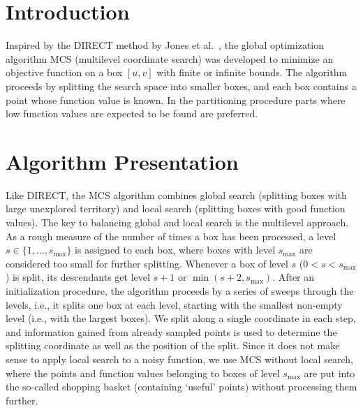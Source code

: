 \documentclass{sig-alternate}
\begin{document}



\section{Introduction}
%
Inspired by the {DIRECT} method by Jones et al.~\cite{jones}, the global
optimization algorithm MCS (multilevel coordinate search) \cite{mcs} was developed 
to minimize an objective function on a box $[u,v]$ with finite or infinite bounds.
The algorithm proceeds by splitting the search space into smaller boxes, and each
box contains a point whose function value is known. In the partitioning procedure
parts where low function values are expected to be found are preferred.

\section{Algorithm Presentation}
%
Like {DIRECT}, the MCS algorithm combines global search (splitting boxes with
large unexplored territory) and local search (splitting boxes with good function
values). The key to balancing global and local search is the multilevel approach.
As a rough measure of the number of times a box has been processed, a level
$s \in \{1,\dots,s_{\max}\}$ is assigned to each box, where boxes with level $s_{\max}$ 
are considered too small for further splitting. Whenever a box of level $s$
($0 < s < s_{\max}$) is split, its descendants get level $s+1$ or $\min(s+2,s_{\max})$.
After an initialization procedure, the algorithm proceeds by a series of sweeps
through the levels, i.e., it splits one box at each level, starting with the 
smallest non-empty level (i.e., with the largest boxes). We split along a single
coordinate in each step, and information gained from already sampled points
is used to determine the splitting coordinate as well as the position of the split.
Since it does not make sense to apply local search to a noisy function, we use
MCS without local search, where the points and function values belonging to boxes
of level $s_{\max}$ are put into the so-called shopping basket (containing `useful'
points) without processing
them further.
\end{document}
